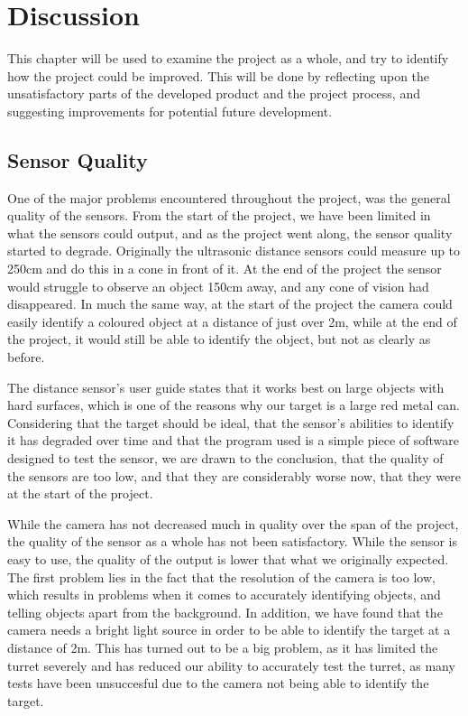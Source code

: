 \chapter{Discussion}\label{projDiscus}
This chapter will be used to examine the project as a whole, and try to identify
how the project could be improved. This will be done by reflecting upon the
unsatisfactory parts of the developed product and the project process, and
suggesting improvements for potential future development.

\section{Sensor Quality}\label{DSQ}
One of the major problems encountered throughout the project, was the
general quality of the sensors. From the start of the project, we have been
limited in what the sensors could output, and as the project went along, the
sensor quality started to degrade. Originally the ultrasonic distance sensors
could measure up to 250cm and do this in a cone in front of it. At the end
of the project the sensor would struggle to observe an object 150cm away, and
any cone of vision had disappeared. In much the same way, at the start of the
project the camera could easily identify a coloured object at a distance of just
over 2m, while at the end of the project, it would still be able to identify the
object, but not as clearly as before.\nl

The distance sensor's user guide states that it works best on large objects with
hard surfaces, which is one of the reasons why our target is a large red metal
can. Considering that the target should be ideal, that the sensor's
abilities to identify it has degraded over time and that the program used
is a simple piece of software designed to test the sensor, we are drawn to the
conclusion, that the quality of the sensors are too low, and that they are
considerably worse now, that they were at the start of the project.\nl

While the camera has not decreased much in quality over the span of the project,
the quality of the sensor as a whole has not been satisfactory. While the sensor
is easy to use, the quality of the output is lower that what we originally
expected. The first problem lies in the fact that the resolution of the camera
is too low, which results in problems when it comes to accurately identifying
objects, and telling objects apart from the background. In addition, we have
found that the camera needs a bright light source in order to be able to
identify the target at a distance of 2m. This has turned out to be a big
problem, as it has limited the turret severely and has reduced our ability to
accurately test the turret, as many tests have been unsuccesful due to the
camera not being able to identify the target.\nl

